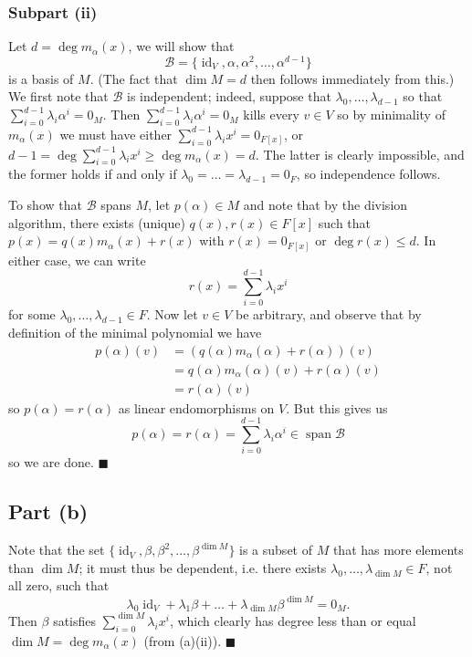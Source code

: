 \documentclass[12pt]{article}
\DeclareMathOperator{\id}{id}
\DeclareMathOperator{\spn}{span}
\begin{document}
\subsubsection*{Subpart (ii)}
Let $d=\deg m_\alpha(x)$, we will show that
\[
    \mathcal{B}=\{\id_V,\alpha,\alpha^2,\ldots,\alpha^{d-1}\}
\]
is a basis of $M$. (The fact that $\dim M=d$ then follows immediately from this.)
We first note that $\mathcal{B}$ is independent; indeed, suppose that
$\lambda_0,\ldots,\lambda_{d-1}$ so that
$\sum_{i=0}^{d-1}\lambda_i\alpha^i=0_{M}$. Then
$\sum_{i=0}^{d-1}\lambda_i\alpha^i=0_{M}$ kills every $v\in V$ so by minimality
of $m_\alpha(x)$ we must have either
$\sum_{i=0}^{d-1}\lambda_i x^i=0_{F[x]}$, or $d-1=\deg
\sum_{i=0}^{d-1}\lambda_i x^i \ge \deg m_\alpha(x)=d$. The latter is clearly
impossible, and the former holds if and only if
$\lambda_0=\ldots=\lambda_{d-1}=0_F$, so independence follows.

To show that $\mathcal{B}$ spans $M$, let $p(\alpha)\in M$ and note that by
the division algorithm, there exists (unique) $q(x),r(x)\in F[x]$ such that 
$p(x)=q(x)m_\alpha(x)+r(x)$ with 
$r(x)=0_{F[x]}$ or $\deg r(x)\le d$. In either case, we can write
\[
    r(x)=\sum_{i=0}^{d-1}\lambda_i x^i
\]
for some $\lambda_0,\ldots,\lambda_{d-1}\in F$. Now let $v\in V$ be arbitrary,
and observe that by definition of the minimal polynomial we have
\begin{align*}
    p(\alpha)(v)
    &=(q(\alpha)m_\alpha(\alpha)+r(\alpha))(v)
  \\&=q(\alpha)m_\alpha(\alpha)(v)+r(\alpha)(v)
  \\&=r(\alpha)(v)
\end{align*}
so $p(\alpha)=r(\alpha)$ as linear endomorphisms on $V$. But this gives us
\[
    p(\alpha)=r(\alpha)=\sum_{i=0}^{d-1}\lambda_i \alpha^i\in\spn\mathcal{B}
\]
so we are done.
\hfill$\blacksquare$

\subsection*{Part (b)}
Note that the set $\{\id_V,\beta,\beta^2,\ldots,\beta^{\dim M}\}$ is a subset of
$M$ that has more elements than $\dim M$; it must thus be
dependent, i.e. there exists $\lambda_0,\ldots,\lambda_{\dim M}\in F$, not
all zero, such that
\[
    \lambda_0\id_V+\lambda_1\beta+\ldots+\lambda_{\dim M}\beta^{\dim M}=0_M.
\]
Then $\beta$ satisfies $\sum_{i=0}^{\dim M}\lambda_i x^i$, which clearly
has degree less than or equal $\dim M=\deg m_\alpha(x)$ (from (a)(ii)).
\hfill$\blacksquare$
\end{document}
